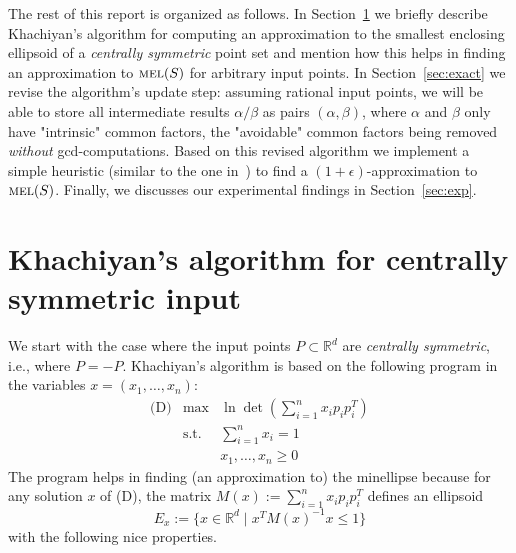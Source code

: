 \documentclass[a4paper,twocolumn]{article}
\newcommand{\R}{\ensuremath{\mathbb{R}}}
\newcommand{\MEL}{\ensuremath{\mathop{\textnormal{\textsc{mel}}}\nolimits}}
\begin{document}
The rest of this report is organized as follows.  In
Section~\ref{sec:khachiyan} we briefly describe Khachiyan's algorithm
for computing an approximation to the smallest enclosing ellipsoid of
a \emph{centrally symmetric} point set and mention how this helps in
finding an approximation to $\MEL(S)$ for arbitrary input points.  In
Section~\ref{sec:exact} we revise the algorithm's update step:
assuming rational input points, we will be able to store all
intermediate results $\alpha/\beta$ as pairs $(\alpha,\beta)$, where
$\alpha$ and $\beta$ only have "intrinsic" common factors, the
"avoidable" common factors being removed \emph{without}
gcd-computations.  Based on this revised algorithm we implement a
simple heuristic (similar to the one in~\cite{kmy-ccsasehhd-03}) to
find a $(1+\epsilon)$-approximation to $\MEL(S)$.  Finally, we
discusses our experimental findings in Section~\ref{sec:exp}.

\section{Khachiyan's algorithm for centrally symmetric input}
\label{sec:khachiyan}

We start with the case where the input points $P\subset \R^d$ are
\emph{centrally symmetric}, i.e., where $P=-P$.  Khachiyan's algorithm
is based on the following program in the variables
$x=(x_1,\ldots,x_n)$:
\begin{equation}
  \label{eq:dual}
  \begin{array}{lll}
    \mbox{(D)} & \mbox{max}  & \ln \det(\sum_{i=1}^n x_i p_i p_i^T) \\
    & \mbox{s.t.} & \sum_{i=1}^n x_i = 1 \\
    &             & x_1,\ldots,x_n \ge 0
  \end{array}
\end{equation}
The program helps in finding (an approximation to) the minellipse
because for any solution $x$ of (D), the matrix $M(x):= \sum_{i=1}^n
x_i p_i p_i^T$ defines an ellipsoid
\begin{equation}
  \label{eq:sol_ell}
  E_x:= \{ x \in \R^d \mid x^T M(x)^{-1} x \le 1 \}
\end{equation}
with the following nice properties.
\end{document}
